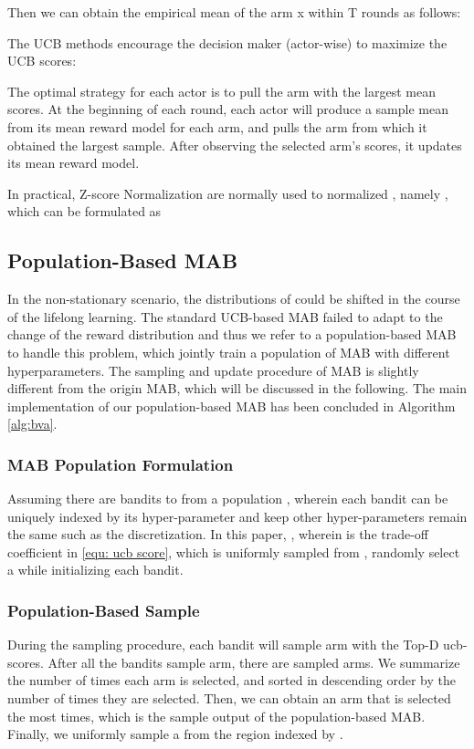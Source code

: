 Then we can obtain the empirical mean of the arm x within T rounds as follows:



The UCB methods  encourage the decision maker (actor-wise) to maximize the UCB scores:

The optimal strategy for each actor is to pull the arm with the largest mean scores. At the beginning of each round, each actor will produce a sample mean from its mean reward model for each arm, and pulls the arm from which it obtained the largest sample. After observing the selected arm's scores, it updates its mean reward model.

\begin{Remark}
    In practical,  Z-score Normalization  are normally  used to  normalized , namely , which can be formulated as 
    
\end{Remark}


\subsection{Population-Based  MAB}
In the non-stationary scenario, the distributions of  could be shifted in the course of the lifelong learning. The standard UCB-based MAB failed  to adapt to the change of the reward distribution and thus we refer to a population-based MAB to handle this problem, which jointly train a population of MAB with different hyperparameters. The sampling and update procedure of MAB is slightly different from the origin MAB, which will be discussed in the following. The main implementation of our population-based MAB has been concluded in Algorithm \ref{alg:bva}. 

\subsubsection{MAB Population Formulation}
Assuming there are  bandits  to from a population , wherein each bandit can be uniquely indexed by its hyper-parameter  and keep other hyper-parameters remain the same such as the discretization. In this paper, , wherein  is the trade-off coefficient in \eqref{equ: ucb score}, which is uniformly sampled from , \ie randomly select a  while initializing each bandit. 

\subsubsection{Population-Based Sample}
During the sampling procedure, each bandit  will sample  arm  with the Top-D ucb-scores.  After all the bandits sample  arm, there are  sampled arms. We summarize the number of times each arm is selected, and sorted in descending order by the number of times they are selected. Then,  we can obtain an arm  that is selected the most times, which is the sample output of the population-based MAB. Finally, we uniformly sample a  from  the region indexed by .


